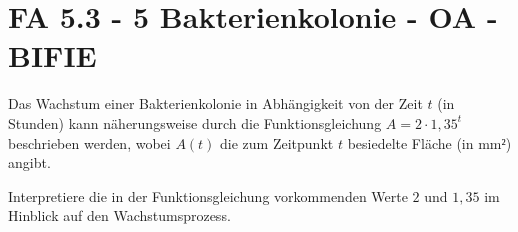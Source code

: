 \section{FA 5.3 - 5 Bakterienkolonie - OA - BIFIE}

\begin{beispiel}[FA 5.3]{1} %
Das Wachstum einer Bakterienkolonie in Abhängigkeit von der Zeit $t$ (in Stunden) kann näherungsweise
durch die Funktionsgleichung $A = 2 \cdot 1,35^t$
 beschrieben werden, wobei $A(t)$ die
zum Zeitpunkt $t$ besiedelte Fläche (in $\text{mm}²$) angibt. 

\leer

Interpretiere die in der Funktionsgleichung vorkommenden Werte $2$ und $1,35$ im Hinblick auf den Wachstumsprozess.


\end{beispiel}
